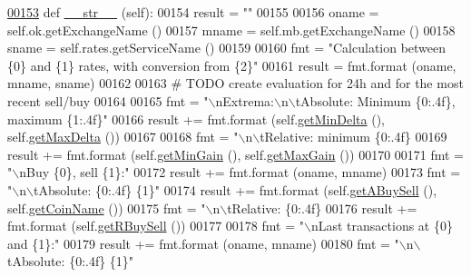 \begin{DoxyCode}
\hypertarget{classexch2exch_1_1_differences.tex_l00153}{}\hyperlink{classexch2exch_1_1_differences_af2d3dc1abc5bfb7f84192e03af199c5f}{00153}     \textcolor{keyword}{def }\hyperlink{classexch2exch_1_1_differences_af2d3dc1abc5bfb7f84192e03af199c5f}{\_\_str\_\_} (self):
00154         result = \textcolor{stringliteral}{""}
00155         
00156         oname = self.ok.getExchangeName ()
00157         mname = self.mb.getExchangeName ()
00158         sname = self.rates.getServiceName ()
00159         
00160         fmt = \textcolor{stringliteral}{"Calculation between \{0\} and \{1\} rates, with conversion from \{2\}"}
00161         result = fmt.format (oname, mname, sname)
00162         
00163         \textcolor{comment}{# TODO create evaluation for 24h and for the most recent sell/buy}
00164         
00165         fmt = \textcolor{stringliteral}{"\(\backslash\)nExtrema:\(\backslash\)n\(\backslash\)tAbsolute: Minimum \{0:.4f\}, maximum \{1:.4f\}"}
00166         result += fmt.format (self.\hyperlink{classexch2exch_1_1_differences_ad2c60e37e0a390dd89be5d9388e552a4}{getMinDelta} (), self.\hyperlink{classexch2exch_1_1_differences_a577c9c2cbc470643f7bff8fc50295816}{getMaxDelta} ())
00167         
00168         fmt = \textcolor{stringliteral}{"\(\backslash\)n\(\backslash\)tRelative: minimum \{0:.4f\} %
00169         result += fmt.format (self.\hyperlink{classexch2exch_1_1_differences_a110cb3a79f744b6d3911b6669b8a0a89}{getMinGain} (), self.\hyperlink{classexch2exch_1_1_differences_a3b557469ba68c3041d6ef04dc847c77b}{getMaxGain} ())
00170         
00171         fmt = \textcolor{stringliteral}{"\(\backslash\)nBuy \{0\}, sell \{1\}:"}
00172         result += fmt.format (oname, mname)
00173         fmt = \textcolor{stringliteral}{"\(\backslash\)n\(\backslash\)tAbsolute: \{0:.4f\} \{1\}"}
00174         result += fmt.format (self.\hyperlink{classexch2exch_1_1_differences_a5b1000fb221e0726fb36a8e9a0655d84}{getABuySell} (), self.\hyperlink{classexch2exch_1_1_differences_a27c3904cedfe6f58d750591c1f7c7879}{getCoinName} ())
00175         fmt = \textcolor{stringliteral}{"\(\backslash\)n\(\backslash\)tRelative: \{0:.4f\} %
00176         result += fmt.format (self.\hyperlink{classexch2exch_1_1_differences_ae360dc9692075e21d0aafa2ff1dc23d4}{getRBuySell} ())
00177         
00178         fmt = \textcolor{stringliteral}{"\(\backslash\)nLast transactions at \{0\} and \{1\}:"}
00179         result += fmt.format (oname, mname)
00180         fmt = \textcolor{stringliteral}{"\(\backslash\)n\(\backslash\)tAbsolute: \{0:.4f\} \{1\}"}
}}
\end{DoxyCode}
